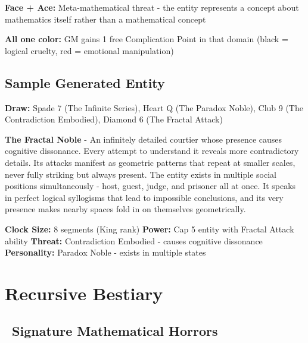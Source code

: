 \documentclass[11pt]{article}
\begin{document}
\textbf{Face + Ace:} Meta-mathematical threat - the entity represents a concept about mathematics itself rather than a mathematical concept

\textbf{All one color:} GM gains 1 free Complication Point in that domain (black = logical cruelty, red = emotional manipulation)

\subsection*{Sample Generated Entity}

\textbf{Draw:} Spade 7 (The Infinite Series), Heart Q (The Paradox Noble), Club 9 (The Contradiction Embodied), Diamond 6 (The Fractal Attack)

\textbf{The Fractal Noble} - An infinitely detailed courtier whose presence causes cognitive dissonance. Every attempt to understand it reveals more contradictory details. Its attacks manifest as geometric patterns that repeat at smaller scales, never fully striking but always present. The entity exists in multiple social positions simultaneously - host, guest, judge, and prisoner all at once. It speaks in perfect logical syllogisms that lead to impossible conclusions, and its very presence makes nearby spaces fold in on themselves geometrically.

\textbf{Clock Size:} 8 segments (King rank)
\textbf{Power:} Cap 5 entity with Fractal Attack ability
\textbf{Threat:} Contradiction Embodied - causes cognitive dissonance
\textbf{Personality:} Paradox Noble - exists in multiple states

\section{Recursive Bestiary}

\subsection*{\faDragon\ Signature Mathematical Horrors}
\end{document}

